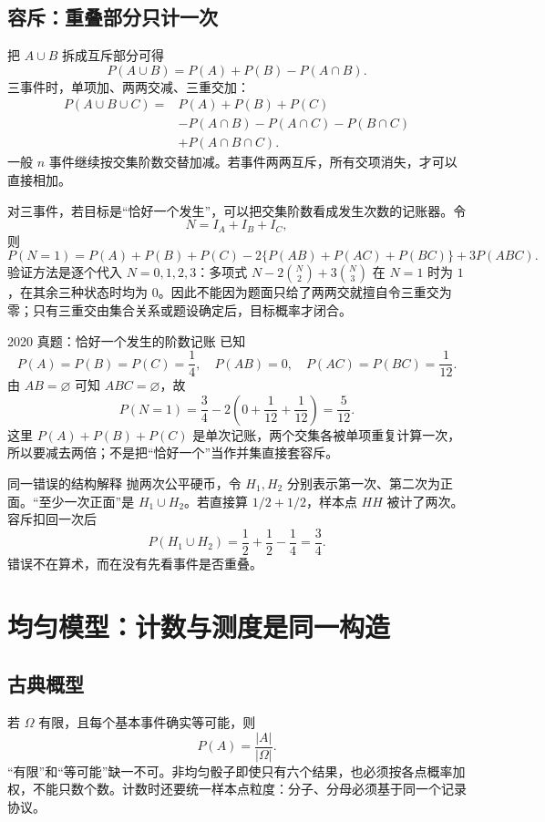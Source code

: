 \documentclass[11pt,a4paper]{ctexart}
\begin{document}
\subsection{容斥：重叠部分只计一次}

把 $A\cup B$ 拆成互斥部分可得
\[
\boxed{P(A\cup B)=P(A)+P(B)-P(A\cap B).}
\]
三事件时，单项加、两两交减、三重交加：
\begin{align*}
P(A\cup B\cup C)
={}&P(A)+P(B)+P(C)\\
&-P(A\cap B)-P(A\cap C)-P(B\cap C)\\
&+P(A\cap B\cap C).
\end{align*}
一般 $n$ 事件继续按交集阶数交替加减。若事件两两互斥，所有交项消失，才可以直接相加。

对三事件，若目标是“恰好一个发生”，可以把交集阶数看成发生次数的记账器。令
\[
N=I_A+I_B+I_C,
\]
则
\[
\boxed{P(N=1)=P(A)+P(B)+P(C)-2\{P(AB)+P(AC)+P(BC)\}+3P(ABC).}
\]
验证方法是逐个代入 $N=0,1,2,3$：多项式 $N-2\binom N2+3\binom N3$ 在 $N=1$ 时为 $1$，在其余三种状态时均为 $0$。因此不能因为题面只给了两两交就擅自令三重交为零；只有三重交由集合关系或题设确定后，目标概率才闭合。

\begin{examplebox}{2020 真题：恰好一个发生的阶数记账}
已知
\[
P(A)=P(B)=P(C)=\frac14,\quad P(AB)=0,\quad P(AC)=P(BC)=\frac1{12}.
\]
由 $AB=\varnothing$ 可知 $ABC=\varnothing$，故
\[
P(N=1)=\frac34-2\left(0+\frac1{12}+\frac1{12}\right)=\frac5{12}.
\]
这里 $P(A)+P(B)+P(C)$ 是单次记账，两个交集各被单项重复计算一次，所以要减去两倍；不是把“恰好一个”当作并集直接套容斥。
\end{examplebox}

\begin{examplebox}{同一错误的结构解释}
抛两次公平硬币，令 $H_1,H_2$ 分别表示第一次、第二次为正面。“至少一次正面”是 $H_1\cup H_2$。若直接算 $1/2+1/2$，样本点 $HH$ 被计了两次。容斥扣回一次后
\[
P(H_1\cup H_2)=\frac12+\frac12-\frac14=\frac34.
\]
错误不在算术，而在没有先看事件是否重叠。
\end{examplebox}

\section{均匀模型：计数与测度是同一构造}

\subsection{古典概型}

若 $\Omega$ 有限，且每个基本事件确实等可能，则
\[
\boxed{P(A)=\frac{\lvert A\rvert}{\lvert\Omega\rvert}.}
\]
“有限”和“等可能”缺一不可。非均匀骰子即使只有六个结果，也必须按各点概率加权，不能只数个数。计数时还要统一样本点粒度：分子、分母必须基于同一个记录协议。
\end{document}

